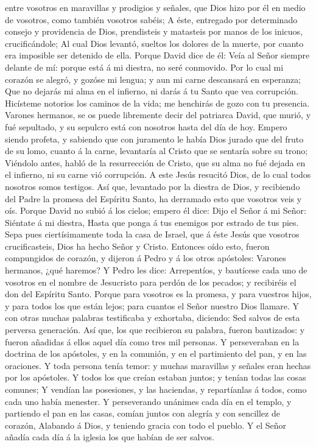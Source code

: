 entre vosotros en maravillas y prodigios y señales, que Dios hizo por él
en medio de vosotros, como también vosotros sabéis;  A
éste, entregado por determinado consejo y providencia de Dios,
prendisteis y matasteis por manos de los inicuos, crucificándole;
 Al cual Dios levantó, sueltos los dolores de la muerte,
por cuanto era imposible ser detenido de ella.  Porque
David dice de él: Veía al Señor siempre delante de mí: porque está á mi
diestra, no seré conmovido.  Por lo cual mi corazón se
alegró, y gozóse mi lengua; y aun mi carne descansará en esperanza;
 Que no dejarás mi alma en el infierno, ni darás á tu
Santo que vea corrupción.  Hicísteme notorios los caminos
de la vida; me henchirás de gozo con tu presencia. 
Varones hermanos, se os puede libremente decir del patriarca David, que
murió, y fué sepultado, y su sepulcro está con nosotros hasta del día de
hoy.  Empero siendo profeta, y sabiendo que con juramento
le había Dios jurado que del fruto de su lomo, cuanto á la carne,
levantaría al Cristo que se sentaría sobre su trono; 
Viéndolo antes, habló de la resurrección de Cristo, que su alma no fué
dejada en el infierno, ni su carne vió corrupción.  A
este Jesús resucitó Dios, de lo cual todos nosotros somos testigos.
 Así que, levantado por la diestra de Dios, y recibiendo
del Padre la promesa del Espíritu Santo, ha derramado esto que vosotros
veis y oís.  Porque David no subió á los cielos; empero
él dice: Dijo el Señor á mi Señor: Siéntate á mi diestra,
 Hasta que ponga á tus enemigos por estrado de tus pies.
 Sepa pues ciertísimamente toda la casa de Israel, que á
éste Jesús que vosotros crucificasteis, Dios ha hecho Señor y Cristo.
 Entonces oído esto, fueron compungidos de corazón, y
dijeron á Pedro y á los otros apóstoles: Varones hermanos, ¿qué haremos?
 Y Pedro les dice: Arrepentíos, y bautícese cada uno de
vosotros en el nombre de Jesucristo para perdón de los pecados; y
recibiréis el don del Espíritu Santo.  Porque para
vosotros es la promesa, y para vuestros hijos, y para todos los que
están lejos; para cuantos el Señor nuestro Dios llamare. 
Y con otras muchas palabras testificaba y exhortaba, diciendo: Sed
salvos de esta perversa generación.  Así que, los que
recibieron su palabra, fueron bautizados: y fueron añadidas á ellos
aquel día como tres mil personas.  Y perseveraban en la
doctrina de los apóstoles, y en la comunión, y en el partimiento del
pan, y en las oraciones.  Y toda persona tenía temor: y
muchas maravillas y señales eran hechas por los apóstoles.
 Y todos los que creían estaban juntos; y tenían todas
las cosas comunes;  Y vendían las posesiones, y las
haciendas, y repartíanlas á todos, como cada uno había menester.
 Y perseverando unánimes cada día en el templo, y
partiendo el pan en las casas, comían juntos con alegría y con sencillez
de corazón,  Alabando á Dios, y teniendo gracia con todo
el pueblo. Y el Señor añadía cada día á la iglesia los que habían de ser
salvos.

